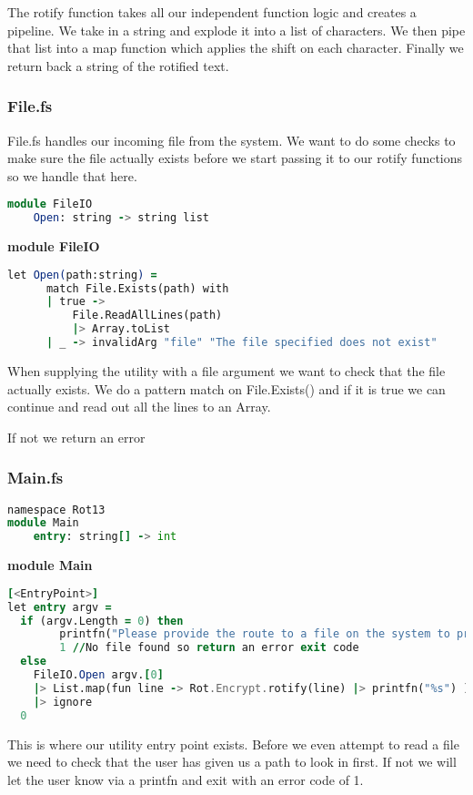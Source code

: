 The rotify function takes all our independent function logic and creates a pipeline.
We take in a string and explode it into a list of characters. We then pipe that list
into a map function which applies the shift on each character. Finally we return back
a string of the rotified text.

\subsubsection{File.fs}

File.fs handles our incoming file from the system. We want to do some checks to make
sure the file actually exists before we start passing it to our rotify functions so we handle that here.

\begin{lstlisting}[language=F]
module FileIO
    Open: string -> string list
\end{lstlisting}

\textbf{module FileIO}
\begin{lstlisting}[language=F]
  let Open(path:string) =
      match File.Exists(path) with
      | true ->
          File.ReadAllLines(path)
          |> Array.toList
      | _ -> invalidArg "file" "The file specified does not exist"
\end{lstlisting}
When supplying the utility with a file argument we want to check that the
file actually exists. We do a pattern match on File.Exists() and if it is true
we can continue and read out all the lines to an Array.

If not we return an error

\subsubsection{Main.fs}
\begin{lstlisting}[language=F]
namespace Rot13
module Main
    entry: string[] -> int
\end{lstlisting}

\textbf{module Main}
\begin{lstlisting}[language=F]
[<EntryPoint>]
let entry argv =
  if (argv.Length = 0) then
        printfn("Please provide the route to a file on the system to process")
        1 //No file found so return an error exit code
  else
    FileIO.Open argv.[0]
    |> List.map(fun line -> Rot.Encrypt.rotify(line) |> printfn("%s") )
    |> ignore
  0
\end{lstlisting}

This is where our utility entry point exists. Before we even attempt to read a file
we need to check that the user has given us a path to look in first. If not
we will let the user know via a printfn and exit with an error code of 1.

